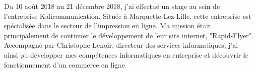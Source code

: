 Du 10 août 2018 au 21 décembre 2018, j'ai effectué un stage au sein de l'entreprise Kalicommunication.
Située à Marquette-Lez-Lille, cette entreprise est spécialisée dans le secteur de l'impression en ligne.\newline
Ma mission était principalement de continuer le développement de leur site internet, "Rapid-Flyer".
Accompagné par Christophe Lenoir, directeur des services informatiques, j'ai ainsi pu développer mes compétences informatiques en entreprise et découvrir le fonctionnement d'un commerce en ligne.